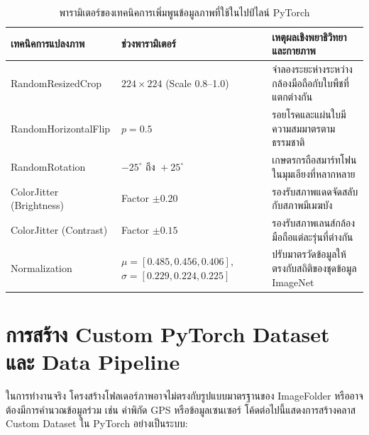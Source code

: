 \begin{table}[H]
\caption{พารามิเตอร์ของเทคนิคการเพิ่มพูนข้อมูลภาพที่ใช้ในไปป์ไลน์ PyTorch}
\label{tab:ch02_aug_params}
\begin{tabularx}{\textwidth}{L{4.2cm}L{3.0cm}Y}
\toprule
\textbf{เทคนิคการแปลงภาพ} & \textbf{ช่วงพารามิเตอร์} & \textbf{เหตุผลเชิงพยาธิวิทยาและกายภาพ} \\
\midrule
RandomResizedCrop & $224 \times 224$ (Scale 0.8--1.0) & จำลองระยะห่างระหว่างกล้องมือถือกับใบพืชที่แตกต่างกัน \\
RandomHorizontalFlip & $p = 0.5$ & รอยโรคและแผ่นใบมีความสมมาตรตามธรรมชาติ \\
RandomRotation & $-25^{\circ} \text{ ถึง } +25^{\circ}$ & เกษตรกรถือสมาร์ทโฟนในมุมเอียงที่หลากหลาย \\
ColorJitter (Brightness) & Factor $\pm 0.20$ & รองรับสภาพแดดจัดสลับกับสภาพมีเมฆบัง \\
ColorJitter (Contrast) & Factor $\pm 0.15$ & รองรับสภาพเลนส์กล้องมือถือแต่ละรุ่นที่ต่างกัน \\
Normalization & $\mu=[0.485, 0.456, 0.406]$, $\sigma=[0.229, 0.224, 0.225]$ & ปรับมาตรวัดข้อมูลให้ตรงกับสถิติของชุดข้อมูล ImageNet \\
\bottomrule
\end{tabularx}
\end{table}

\section{การสร้าง Custom PyTorch Dataset และ Data Pipeline}

ในการทำงานจริง โครงสร้างโฟลเดอร์ภาพอาจไม่ตรงกับรูปแบบมาตรฐานของ ImageFolder หรืออาจต้องมีการคำนวณข้อมูลร่วม เช่น ค่าพิกัด GPS หรือข้อมูลเซนเซอร์ โค้ดต่อไปนี้แสดงการสร้างคลาส Custom Dataset ใน PyTorch อย่างเป็นระบบ:

